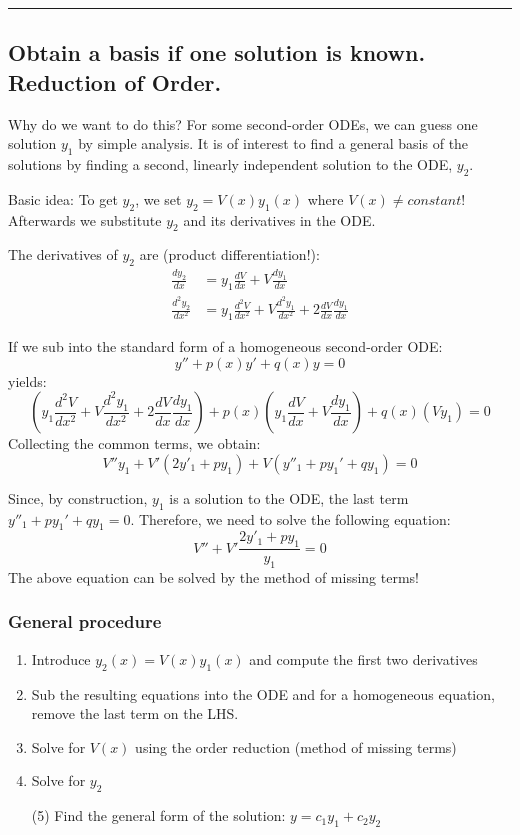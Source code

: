 \begin{center}
\noindent\rule{4cm}{0.4pt}
\end{center}

\subsection{Obtain a basis if one solution is known. Reduction of Order.}
Why do we want to do this? For some second-order ODEs, we can guess one solution $y_1$ by simple analysis. It is of interest to find a general basis of the solutions by finding a second, linearly independent solution to the ODE, $y_2$.
 
Basic idea: To get $y_2$, we set $y_2=V(x) y_1(x)$ where $V(x)\neq constant$! Afterwards we substitute $y_2$ and its derivatives in the ODE. 

The derivatives of $y_2$ are (product differentiation!):
\begin{eqnarray}
\frac{d y_2}{dx}&=y_1\frac{d V}{dx}+V\frac{d y_1}{dx}\\
\frac{d^2 y_2}{dx^2}&=y_1\frac{d^2 V}{dx^2}+V\frac{d^2 y_1}{dx^2}+2\frac{d V}{dx}\frac{d y_1}{dx}
\end{eqnarray}

If we sub into the standard form of a homogeneous second-order ODE:
\begin{equation*}
y''+p(x)y'+q(x)y=0
\end{equation*}
yields:
\begin{equation*}
\left(y_1\frac{d^2 V}{dx^2}+V\frac{d^2 y_1}{dx^2}+2\frac{d V}{dx}\frac{d y_1}{dx}\right)+p(x)\left(y_1\frac{d V}{dx}+V\frac{d y_1}{dx}\right)+q(x)(V y_1)=0
\end{equation*}
Collecting the common terms, we obtain:
\begin{equation*}
V''y_1+V'\left(2y'_1 + py_1\right) + V\left(y''_1+py_1'+qy_1\right)=0
\end{equation*}

Since, by construction, $y_1$ is a solution to the ODE, the last term $y''_1+py_1'+qy_1=0$. Therefore, we need to solve the following equation:
\begin{equation*}
V'' + V'\frac{2y'_1 + py_1}{y_1} =0
\end{equation*}
The above equation can be solved by the method of missing terms!


\subsubsection*{General procedure}
\begin{enumerate}
\item Introduce $y_2(x)=V(x)y_1(x)$ and compute the first two derivatives
\item Sub the resulting equations into the ODE and for a homogeneous equation, remove the last term on the LHS.
\item Solve for $V(x)$ using the order reduction (method of missing terms)
\item Solve for $y_2$
\item[(5)]Find the general form of the solution: $y=c_1 y_1+c_2y_2$
\end{enumerate}

\updateinfo[October 12, 2018]